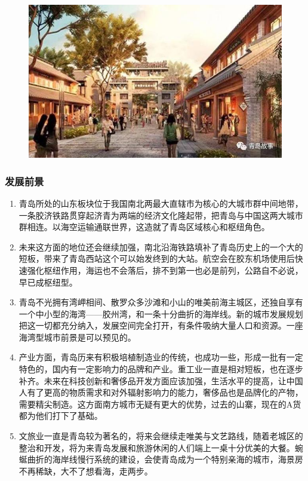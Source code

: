 \documentclass{article}
\begin{document}
\begin{figure}[h!]
\centering
\includegraphics[scale=0.25]{wenhua}
\caption{}
\label{fig:wenhua}
\end{figure}

\subsubsection{发展前景}

\begin{enumerate}[(1)]
	\item 青岛所处的山东板块位于我国南北两最大直辖市为核心的大城市群中间地带，一条胶济铁路贯穿起济青为两端的经济文化隆起带，把青岛与中国这两大城市群相连。以海空运输通联世界，这造就了青岛区域核心和枢纽角色。
	\item 未来这方面的地位还会继续加强，南北沿海铁路填补了青岛历史上的一个大的短板，带来了青岛西站这个可以始发终到的大站。航空会在胶东机场使用后快速强化枢纽作用，海运也不会落后，排不到第一也必是前列，公路自不必说，早已成枢纽型。
    \item 青岛不光拥有湾岬相间、散罗众多沙滩和小山的唯美前海主城区，还独自享有一个中小型的海湾——胶州湾，和一条十分曲折的海岸线。新的城市发展规划把这一切都充分纳入，发展空间完全打开，有条件吸纳大量人口和资源。一座海湾型城市前景是可以预见的。
	\item 产业方面，青岛历来有积极培植制造业的传统，也成功一些，形成一批有一定特色的，国内有一定影响力的品牌和产业。重工业一直是相对短板，也在逐步补齐。未来在科技创新和奢侈品开发方面应该加强，生活水平的提高，让中国人有了更高的物质需求和对外辐射影响力的能力，奢侈品也是品牌化的产物，需要精尖制造。这方面南方城市无疑有更大的优势，过去的山寨，现在的A货都为他们打下了基础。
	\item 文旅业一直是青岛较为著名的，将来会继续走唯美与文艺路线，随着老城区的整治和开发，将为来青岛发展和旅游休闲的人们端上一桌十分优美的大餐。蜿蜒曲折的海岸线慢行系统的建设，会使青岛成为一个特别亲海的城市，海景房不再稀缺，大不了想看海，走两步。
\end{enumerate}
\end{document}
